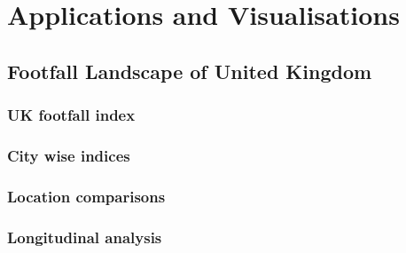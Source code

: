 \chapter{Applications and Visualisations} \label{chapter:application}

\lipsum[1-2]

\section{Footfall Landscape of United Kingdom}
\lipsum[3]
\subsection{UK footfall index}
\lipsum[1]

\subsection{City wise indices}
\lipsum[1]

\subsection{Location comparisons}
\lipsum[1]

\subsection{Longitudinal analysis}
\lipsum[1]

\lipsum[1-2]

